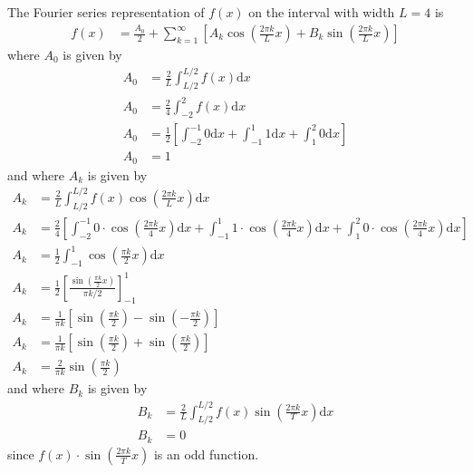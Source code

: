 \documentclass[11pt]{article}
\begin{document}
\subsection{} %
The Fourier series representation of $f(x)$ on the interval with width $L=4$ is
\begin{align*}
    f(x) &= \frac{A_0}{2} + \sum_{k=1}^\infty \left[
        A_k \cos\left( \frac{2 \pi k}{L} x \right)
        + B_k \sin\left( \frac{2 \pi k}{L} x \right)
        \right]
\end{align*}
where $A_0$ is given by
\begin{align*}
    A_0 &= \frac{2}{L} \int_{L/2}^{L/2} f(x) \mathrm{d}x \\
    A_0 &= \frac{2}{4} \int_{-2}^{2} f(x) \mathrm{d}x \\
    A_0 &= \frac{1}{2} \left[
        \int_{-2}^{-1} 0 \mathrm{d}x
        + \int_{-1}^{1} 1 \mathrm{d}x
        + \int_{1}^{2} 0 \mathrm{d}x
        \right] \\
    A_0 &= 1
\end{align*}
and where $A_k$ is given by
\begin{align*}
    A_k &= \frac{2}{L} \int_{L/2}^{L/2} f(x) \cos\left(\frac{2 \pi k}{L}x\right) \mathrm{d}x \\
    A_k &= \frac{2}{4} \left[
        \int_{-2}^{-1} 0 \cdot \cos\left(\frac{2 \pi k}{4}x\right) \mathrm{d}x
        + \int_{-1}^{1} 1 \cdot \cos\left(\frac{2 \pi k}{4}x\right) \mathrm{d}x
        + \int_{1}^{2} 0 \cdot \cos\left(\frac{2 \pi k}{4}x\right) \mathrm{d}x
        \right] \\
    A_k &= \frac{1}{2} \int_{-1}^{1} \cos\left(\frac{\pi k}{2}x\right) \mathrm{d}x \\
    A_k &= \frac{1}{2} \left[ \frac{\sin\left(\frac{\pi k}{2} x\right)}{\pi k / 2} \right]_{-1}^{1} \\
    A_k &= \frac{1}{\pi k} \left[ \sin\left(\frac{\pi k}{2}\right) - \sin\left(-\frac{\pi k}{2}\right) \right] \\
    A_k &= \frac{1}{\pi k} \left[ \sin\left(\frac{\pi k}{2}\right) + \sin\left(\frac{\pi k}{2}\right) \right] \\
    A_k &= \frac{2}{\pi k} \sin\left(\frac{\pi k}{2}\right)
\end{align*}
and where $B_k$ is given by
\begin{align*}
    B_k &= \frac{2}{L} \int_{L/2}^{L/2} f(x) \sin\left(\frac{2 \pi k}{T}x\right) \mathrm{d}x \\
    B_k &= 0
\end{align*}
since $f(x) \cdot \sin\left(\frac{2 \pi k}{T}x\right)$ is an odd function.
\end{document}
